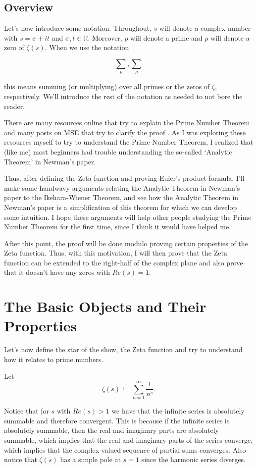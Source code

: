 \documentclass{article}
\theoremstyle{definition}
\begin{document}
\subsection{Overview}

Let's now introduce some notation. Throughout, $ s $ will denote a complex number with $ s = \sigma + it $ and $ \sigma, t \in \mathbb{R} $.
Moreover, $ p $ will denote a prime and $ \rho $ will denote a zero of $ \zeta(s) $.
When we use the notation 

\[ \sum_{p}, \sum_{\rho}\]

this means summing (or multiplying) over all primes or the zeros of $ \zeta $, respectively. We'll introduce
the rest of the notation as needed to not bore the reader.

There are many resources online that try to explain the Prime Number Theorem and many posts
on MSE that try to clarify the proof \cite{bandeira_complex_nodate} \cite{avi_why_2015} \cite{coffee_table_what_2018}. 
As I was exploring these resources myself to try to
understand the Prime Number Theorem, I realized that (like me) most beginners
had trouble understanding the so-called `Analytic Theorem' in Newman's paper.

Thus, after defining the Zeta function and proving Euler's product formula, I'll
make some handwavy arguments relating the Analytic Theorem in Newman's paper
to the Ikehara-Wiener Theorem, and see how the Analytic Theorem in Newman's paper
is a simplification of this theorem for which we can develop some intuition. I hope these
arguments will help other people studying the Prime Number Theorem for the first time,
since I think it would have helped me.

After this point, the proof will be done modulo proving certain properties of the Zeta function.
Thus, with this motivation, I will then prove that the Zeta function can be extended to the
right-half of the complex plane and also prove that it doesn't have any zeros with $ Re(s) = 1 $.

\section{The Basic Objects and Their Properties}

Let's now define the star of the show, the Zeta function and
try to understand how it relates to prime numbers.

Let \[ \zeta(s) := \sum_{n = 1}^{\infty} \frac{1}{n^{s}} .\] 

Notice that for $ s $ with $ Re(s) > 1 $ we have that the infinite series is absolutely
summable and therefore convergent. This is because if the infinite series is absolutely
summable, then the real and imaginary parts are absolutely summable, which implies that
the real and imaginary parts of the series converge, which implies that the complex-valued
sequence of partial sums converges. Also notice that $ \zeta(s) $ has a simple pole
at $ s = 1 $ since the harmonic series diverges. 
\end{document}
